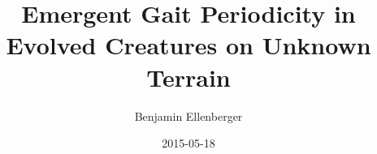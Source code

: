 \documentclass{beamer}
\author{Benjamin Ellenberger}
\title{Emergent Gait Periodicity in Evolved Creatures on Unknown Terrain}
\date{2015-05-18}
\begin{document}
\titleframe


















\end{document}
